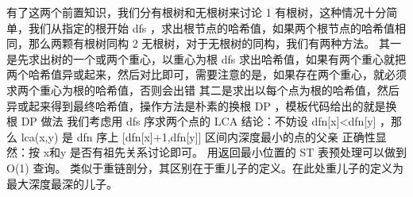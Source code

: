 {}有了这两个前置知识，我们分有根树和无根树来讨论\markdownRendererParagraphSeparator
{}\markdownRendererDollarSign{} 1 \markdownRendererDollarSign{}有根树，这种情况十分简单，我们从指定的根开始\markdownRendererDollarSign{} dfs \markdownRendererDollarSign{}，求出根节点的哈希值，如果两个根节点的哈希值相同，那么两颗有根树同构\markdownRendererParagraphSeparator
{}\markdownRendererDollarSign{} 2 \markdownRendererDollarSign{}无根树，对于无根树的同构，我们有两种方法。\markdownRendererParagraphSeparator
{}其一是先求出树的一个或两个重心，以重心为根\markdownRendererDollarSign{} dfs \markdownRendererDollarSign{}求出哈希值，如果有两个重心就把两个哈希值异或起来，然后对比即可，需要注意的是，如果存在两个重心，就必须求两个重心为根的哈希值，否则会出错\markdownRendererHardLineBreak
{}其二是求出以每个点为根的哈希值，然后异或起来得到最终哈希值，操作方法是朴素的换根\markdownRendererDollarSign{} DP \markdownRendererDollarSign{}，模板代码给出的就是换根\markdownRendererDollarSign{} DP \markdownRendererDollarSign{}做法\markdownRendererInterblockSeparator
{}\markdownRendererInterblockSeparator
{}
\markdownRendererSectionEnd \markdownRendererSectionBegin
{}\markdownRendererInterblockSeparator
{}我们考虑用\markdownRendererDollarSign{} dfs \markdownRendererDollarSign{}序求两个点的\markdownRendererDollarSign{} LCA \markdownRendererDollarSign{}\markdownRendererParagraphSeparator
{}结论：不妨设\markdownRendererDollarSign{} dfn[x]<dfn[y] \markdownRendererDollarSign{}，那么\markdownRendererDollarSign{} lca(x,y) \markdownRendererDollarSign{}是\markdownRendererDollarSign{} dfn \markdownRendererDollarSign{}序上\markdownRendererDollarSign{} [dfn[x]+1,dfn[y]] \markdownRendererDollarSign{}区间内深度最小的点的父亲\markdownRendererParagraphSeparator
{}正确性显然：按\markdownRendererDollarSign{} x和y \markdownRendererDollarSign{}是否有祖先关系讨论即可。\markdownRendererParagraphSeparator
{}用返回最小位置的\markdownRendererDollarSign{} ST \markdownRendererDollarSign{}表预处理可以做到\markdownRendererDollarSign{} O(1) \markdownRendererDollarSign{}查询。\markdownRendererInterblockSeparator
{}\markdownRendererInterblockSeparator
{}
\markdownRendererSectionEnd \markdownRendererSectionBegin
{}\markdownRendererInterblockSeparator
{}类似于重链剖分，其区别在于重儿子的定义。在此处重儿子的定义为最大深度最深的儿子。\markdownRendererParagraphSeparator
